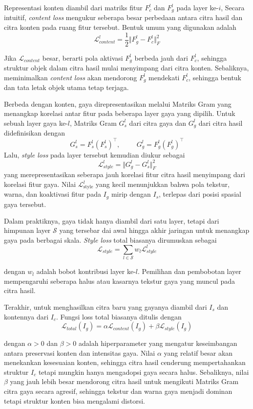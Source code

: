 Representasi konten diambil dari matriks fitur $F_c^l$ dan $F_g^l$ pada layer ke-$i$, Secara intuitif, \textit{content loss} mengukur seberapa besar perbedaan antara citra hasil dan citra konten pada ruang fitur tersebut. Bentuk umum yang digunakan adalah
$$
\mathcal{L}_{content}^l = \frac{1}{2} \Vert F_g^l - F_c^l \Vert_F^2
$$

Jika $\mathcal{L}_{content}$ besar, berarti pola aktivasi $F_g^l$ berbeda jauh dari $F_c^l$, sehingga struktur objek dalam citra hasil mulai menyimpang dari citra konten. Sebaliknya, meminimalkan \textit{content loss} akan mendorong $F_g^l$ mendekati $F_c^l$, sehingga bentuk dan tata letak objek utama tetap terjaga. 

Berbeda dengan konten, gaya direpresentasikan melalui Matriks Gram yang menangkap korelasi antar fitur pada beberapa layer gaya yang dipilih. Untuk sebuah layer gaya ke-$l$, Matriks Gram $G_s^l$ dari citra gaya dan $G_g^l$ dari citra hasil didefinisikan dengan
$$
G_s^l = F_s^l (F_s^l)^\top, \hspace{1cm} G_g^l = F_g^l (F_g^l)^\top
$$
Lalu, \textit{style loss} pada layer tersebut kemudian diukur sebagai
$$
\mathcal{L}_{style}^l = \Vert G_g^l - G_s^l \Vert_F^2
$$
yang merepresentasikan seberapa jauh korelasi fitur citra hasil menyimpang dari korelasi fitur gaya. Nilai $\mathcal{L}_{\text{style}}^l$ yang kecil menunjukkan bahwa pola tekstur, warna, dan koaktivasi fitur pada $I_g$ mirip dengan $I_s$, terlepas dari posisi spasial gaya tersebut.

Dalam praktiknya, gaya tidak hanya diambil dari satu layer, tetapi dari himpunan layer $\mathcal{S}$ yang tersebar dai awal hingga akhir jaringan untuk menangkap gaya pada berbagai skala. \textit{Style loss} total biasanya dirumuskan sebagai
$$
\mathcal{L}_{style} = \sum_{l \in \mathcal{S}} w_l \mathcal{L}^l_{style}
$$

dengan $w_l$ adalah bobot kontribusi layer ke-$l$. Pemilihan dan pembobotan layer mempengaruhi seberapa halus atau kasarnya tekstur gaya yang muncul pada citra hasil.

Terakhir, untuk menghasilkan citra baru yang gayanya diambil dari $I_s$ dan kontennya dari $I_c$. Fungsi loss total biasanya ditulis dengan
$$
\mathcal{L}_{total} (I_g) = \alpha \mathcal{L}_{content}(I_g) + \beta \mathcal{L}_{style} (I_g)
$$

dengan $\alpha > 0$ dan $\beta > 0$ adalah hiperparameter yang mengatur keseimbangan antara preservasi konten dan intensitas gaya. Nilai $\alpha$ yang relatif besar akan menekankan kesesuaian konten, sehingga citra hasil cenderung mempertahankan struktur $I_c$ tetapi mungkin hanya mengadopsi gaya secara halus. Sebaliknya, nilai $\beta$ yang jauh lebih besar mendorong citra hasil untuk mengikuti Matriks Gram citra gaya secara agresif, sehingga tekstur dan warna gaya menjadi dominan tetapi struktur konten bisa mengalami distorsi.

